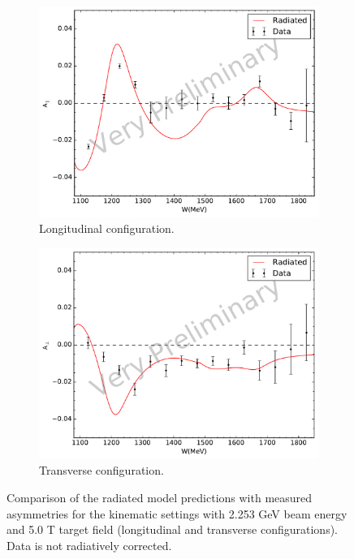 \begin{figure}[p!]
  \centering
  \begin{subfigure}[t]{0.79\textwidth}
    \includegraphics[width=\textwidth]{figs/asymmetry-data-model-22535000.pdf}
    \caption{Longitudinal configuration. \label{C8S2F3a}}
  \end{subfigure}
  \begin{subfigure}[t]{0.79\textwidth}
    \includegraphics[width=\textwidth]{figs/asymmetry-data-model-22535090.pdf}
    \caption{Transverse configuration. \label{C8S2F3b}}
  \end{subfigure}
  \caption[Asymmetries with $E=2.253$ GeV and $B=5.0$ T.]{Comparison of the radiated model predictions with measured asymmetries for the kinematic settings with 2.253 GeV beam energy and 5.0 T target field (longitudinal and transverse configurations). Data is not radiatively corrected. \label{C8S2F3}}
\end{figure}


